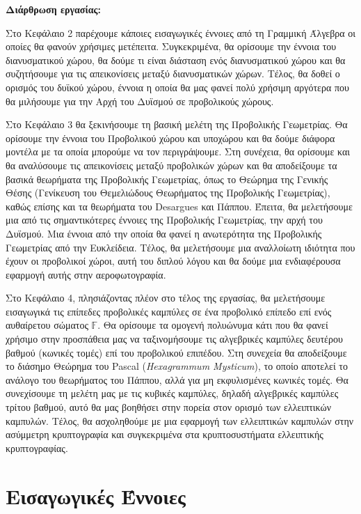 \documentclass[12pt, a4paper]{book}
\begin{document}
\textbf{Διάρθρωση εργασίας: }

Στο Κεφάλαιο 2 παρέχουμε κάποιες εισαγωγικές έννοιες από τη Γραμμική Άλγεβρα οι οποίες θα φανούν χρήσιμες μετέπειτα. Συγκεκριμένα, θα ορίσουμε την έννοια του διανυσματικού χώρου, θα δούμε τι είναι διάσταση ενός διανυσματικού χώρου και θα συζητήσουμε για τις απεικονίσεις μεταξύ διανυσματικών χώρων. Τέλος, θα δοθεί ο ορισμός του δυϊκού χώρου, έννοια η οποία θα μας φανεί πολύ χρήσιμη αργότερα που θα μιλήσουμε για την Αρχή του Δυϊσμού σε προβολικούς χώρους.

Στο Κεφάλαιο 3 θα ξεκινήσουμε τη βασική μελέτη της Προβολικής Γεωμετρίας. Θα ορίσουμε την έννοια του Προβολικού χώρου και υποχώρου και θα δούμε διάφορα μοντέλα με τα οποία μπορούμε να τον περιγράψουμε. Στη συνέχεια, θα ορίσουμε και θα αναλύσουμε τις απεικονίσεις μεταξύ προβολικών χώρων και θα αποδείξουμε τα βασικά θεωρήματα της Προβολικής Γεωμετρίας, όπως το Θεώρημα της Γενικής Θέσης (Γενίκευση του Θεμελιώδους Θεωρήματος της Προβολικής Γεωμετρίας), καθώς επίσης και τα θεωρήματα του \textlatin{Desargues} και Πάππου. Έπειτα, θα  μελετήσουμε μια από τις σημαντικότερες έννοιες της Προβολικής Γεωμετρίας, την αρχή του Δυϊσμού. Μια έννοια από την οποία θα φανεί η ανωτερότητα της Προβολικής Γεωμετρίας από την Ευκλείδεια. Τέλος, θα μελετήσουμε μια αναλλοίωτη ιδιότητα που έχουν οι προβολικοί χώροι, αυτή του διπλού λόγου και θα δούμε μια ενδιαφέρουσα εφαρμογή αυτής στην αεροφωτογραφία.

Στο Κεφάλαιο 4, πλησιάζοντας πλέον στο τέλος της εργασίας, θα μελετήσουμε εισαγωγικά τις επίπεδες προβολικές καμπύλες σε ένα προβολικό επίπεδο επί ενός αυθαίρετου σώματος $\mathbb{F}$. Θα ορίσουμε τα ομογενή πολυώνυμα κάτι που θα φανεί χρήσιμο στην προσπάθεια μας να ταξινομήσουμε τις αλγεβρικές καμπύλες δευτέρου βαθμού (κωνικές τομές) επί του προβολικού επιπέδου. Στη συνεχεία θα αποδείξουμε το διάσημο Θεώρημα του \textlatin{Pascal} (\emph{\textlatin{Hexagrammum Mysticum}}), το οποίο αποτελεί το ανάλογο του θεωρήματος του Πάππου, αλλά για μη εκφυλισμένες κωνικές τομές. Θα συνεχίσουμε τη μελέτη μας με τις κυβικές καμπύλες, δηλαδή αλγεβρικές καμπύλες τρίτου βαθμού, αυτό θα μας βοηθήσει στην πορεία στον ορισμό των ελλειπτικών καμπυλών. Τέλος, θα ασχοληθούμε με μια εφαρμογή των ελλειπτικών καμπυλών στην ασύμμετρη κρυπτογραφία και συγκεκριμένα στα κρυπτοσυστήματα ελλειπτικής κρυπτογραφίας.


\chapter{Εισαγωγικές Έννοιες}
\end{document}
